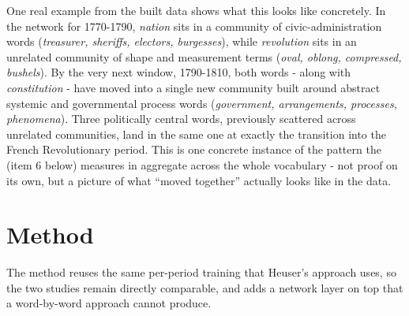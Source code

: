 \documentclass[11pt]{article}
\begin{document}
One real example from the built data shows what this looks like
concretely. In the network for 1770-1790, \emph{nation} sits in a
community of civic-administration words (\emph{treasurer, sheriffs,
electors, burgesses}), while \emph{revolution} sits in an unrelated
community of shape and measurement terms (\emph{oval, oblong,
compressed, bushels}). By the very next window, 1790-1810, both words
- along with \emph{constitution} - have moved into a single new
community built around abstract systemic and governmental process
words (\emph{government, arrangements, processes, phenomena}). Three
politically central words, previously scattered across unrelated
communities, land in the same one at exactly the transition into the
French Revolutionary period. This is one concrete instance of the
pattern the  (item 6 below) measures in
aggregate across the whole vocabulary - not proof on its own, but a
picture of what ``moved together'' actually looks like in the data.

\section{Method}

The method reuses the same per-period training that Heuser's approach
uses, so the two studies remain directly comparable, and adds a network
layer on top that a word-by-word approach cannot produce.
\end{document}
